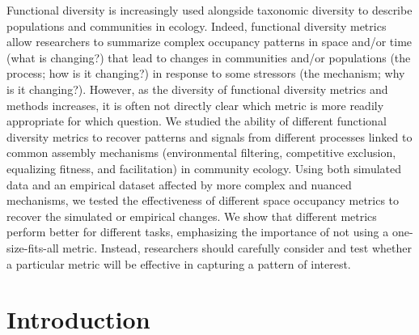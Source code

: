 \documentclass[12pt,letterpaper]{article}
\begin{document}
Functional diversity is increasingly used alongside taxonomic diversity to describe populations and communities in ecology.
Indeed, functional diversity metrics allow researchers to summarize complex occupancy patterns in space and/or time (what is changing?) that lead to changes in communities and/or populations (the process; how is it changing?) in response to some stressors (the mechanism; why is it changing?).
However, as the diversity of functional diversity metrics and methods increases, it is often not directly clear which metric is more readily appropriate for which question.
We studied the ability of different functional diversity metrics to recover patterns and signals from different processes linked to common assembly mechanisms (environmental filtering, competitive exclusion, equalizing fitness, and facilitation) in community ecology.
Using both simulated data and an empirical dataset affected by more complex and nuanced mechanisms, we tested the effectiveness of different space occupancy metrics to recover the simulated or empirical changes.
We show that different metrics perform better for different tasks, emphasizing the importance of not using a one-size-fits-all metric.
Instead, researchers should carefully consider and test whether a particular metric will be effective in capturing a pattern of interest.

\newpage

\section{Introduction}
\end{document}
